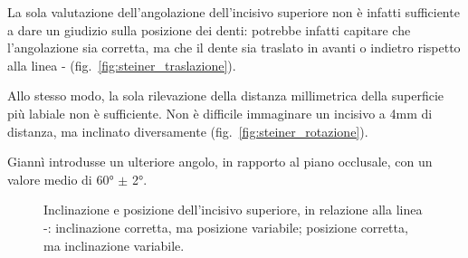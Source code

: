 La sola valutazione dell'angolazione dell'incisivo superiore non è infatti sufficiente a dare un giudizio sulla posizione dei denti: potrebbe infatti capitare che l'angolazione sia corretta, ma che il dente sia traslato in avanti o indietro rispetto alla linea - (fig.~\ref{fig:steiner_traslazione}).

Allo stesso modo, la sola rilevazione della distanza millimetrica della superficie più labiale non è sufficiente. Non è difficile immaginare un incisivo a 4mm di distanza, ma inclinato diversamente (fig.~\ref{fig:steiner_rotazione}).

Giannì introdusse un ulteriore angolo, in rapporto al piano occlusale, con un valore medio di 60° $\pm$ 2°.

\begin{figure}[!p]
 \quad
{}
 \centering
 \caption{Inclinazione e posizione dell'incisivo superiore, in relazione alla linea -:  inclinazione corretta, ma posizione variabile;  posizione corretta, ma inclinazione variabile.}
 \label{fig:steiner_incisivo_rototraslazione}
\end{figure}

